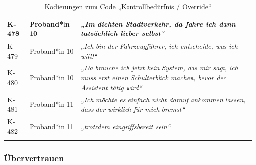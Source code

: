 {\begin{xltabular}{\textwidth}{
    |P{0.10\textwidth}
    |P{0.17\textwidth}
    |Y|
}
\hline
K-478 & Proband*in 10 & \textit{„Im dichten Stadtverkehr, da fahre ich dann tatsächlich lieber selbst“} \\
\hline
K-479 & Proband*in 10 & \textit{„Ich bin der Fahrzeugführer, ich entscheide, was ich will!“} \\
\hline
K-480 & Proband*in 10 & \textit{„Da brauche ich jetzt kein System, das mir sagt, ich muss erst einen Schulterblick machen, bevor der Assistent tätig wird“} \\
\hline
K-481 & Proband*in 11 & \textit{„Ich möchte es einfach nicht darauf ankommen lassen, dass der wirklich für mich bremst“} \\
\hline
K-482 & Proband*in 11 & \textit{„trotzdem eingriffsbereit sein“} \\
\hline
\caption{Kodierungen zum Code „Kontrollbedürfnis / Override“}\label{tab:kodiernachweis-kontrollbeduerfnis-override}\\
\end{xltabular}
}

\clearpage
\subsubsection{Übervertrauen}

